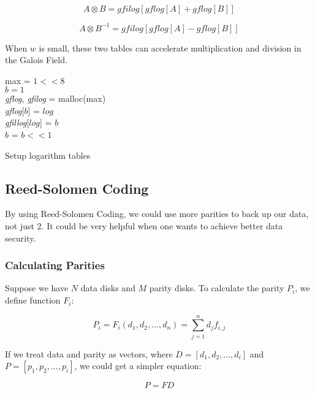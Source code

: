 \documentclass[conference]{IEEEtran}
\begin{document}
\begin{equation}
	A \otimes B = gfilog[gflog[A] + gflog[B]]
\end{equation}

\begin{equation}
	A \otimes B^{-1} = gfilog[gflog[A] - gflog[B]]
\end{equation}

When $w$ is small, these two tables can accelerate multiplication and division in the Galois Field.

\begin{algorithm}
	max = $1<<8$ \\
	$b = 1$ \\
	\emph{gflog}, \emph{gfilog} = malloc(max)\\
	{
		\emph{gflog}[$b$] = $log$\\
		\emph{gfillog}[$log$] = $b$\\
		$b$ = $b<<1$\\
	}
	\caption{Setup logarithm tables}
\end{algorithm}

\subsection{Reed-Solomen Coding}

By using Reed-Solomen Coding, we could use more parities to back up our data, not just 2. It could be very helpful when one wants to achieve better data security.

\subsubsection{Calculating Parities}

Suppose we have $N$ data disks and $M$ parity disks. To calculate the parity $P_i$, we define function $F_i$: 

\begin{equation}
	P_i = F_i(d_1,d_2,...,d_n) = \sum_{j=1}^{n}d_j f_{i,j}
\end{equation}

If we treat data and parity as vectors, where $D = [d_1, d_2, ... , d_i]$ and $P = [p_1, p_2, ... ,p_i]$, we could get a simpler equation:

\begin{equation}
	P=FD
\end{equation}
\end{document}
